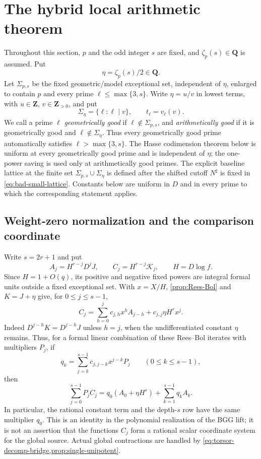 \documentclass[11pt]{article}
\theoremstyle{definition}
\theoremstyle{remark}
\newcommand{\Q}{\mathbf Q}
\newcommand{\Z}{\mathbf Z}
\newcommand{\calK}{\mathcal K}
\begin{document}
\section{The hybrid local arithmetic theorem}\label{sec:hybrid-local}

Throughout this section, $p$ and the odd integer $s$ are fixed, and
$\zeta_p(s)\in\Q$ is assumed.  Put
\[
 \eta=\zeta_p(s)/2\in\Q.
\]
Let $\Sigma_{p,s}$ be the fixed geometric/model exceptional set, independent
of $\eta$, enlarged to contain $p$ and every prime
$\ell\le\max\{3,s\}$.  Write $\eta=u/v$ in lowest terms, with
$u\in\Z$, $v\in\Z_{>0}$, and put
\[
 \Sigma_\eta=\{\ell:\ell\mid v\},
 \qquad t_\ell=v_\ell(v).
\]
We call a prime $\ell$ \emph{geometrically good} if
$\ell\notin\Sigma_{p,s}$, and \emph{arithmetically good} if it is
geometrically good and $\ell\notin\Sigma_\eta$.  Thus every geometrically
good prime automatically satisfies $\ell>\max\{3,s\}$.  The Hasse
codimension theorem below is uniform at every geometrically good prime and is
independent of $\eta$; the one-power saving is used only at arithmetically
good primes.  The explicit baseline lattice at the finite set
$\Sigma_{p,s}\cup\Sigma_\eta$ is defined after the shifted cutoff $N^\sharp$ is fixed in
\eqref{eq:bad-small-lattice}.  Constants below are uniform in $D$ and in every
prime to which the corresponding statement applies.

\subsection{Weight-zero normalization and the comparison coordinate}

Write $s=2r+1$ and put
\begin{equation}\label{eq:A-C-rows}
 A_j=H^{r-j}D^jJ,
 \qquad
 C_j=H^{r-j}\calK_j,
 \qquad
 H=D\log f.
\end{equation}
Since $H=1+O(q)$, its positive and negative fixed powers are integral formal
units outside a fixed exceptional set.  With $x=X/H$, \cref{prop:Rees-Bol}
and $K=J+\eta$ give, for $0\le j\le s-1$,
\begin{equation}\label{eq:C-vs-A}
 \boxed{
 C_j=\sum_{h=0}^jc_{j,h}x^hA_{j-h}
      +c_{j,j}\eta H^r x^j.}
\end{equation}
Indeed $D^{j-h}K=D^{j-h}J$ unless $h=j$, when the undifferentiated
constant $\eta$ remains.  Thus, for a formal linear combination of these
Rees--Bol iterates with multipliers $P_j$, if
\begin{equation}\label{eq:qk-definition}
 q_k=\sum_{j=k}^{s-1}c_{j,j-k}x^{j-k}P_j
 \qquad(0\le k\le s-1),
\end{equation}
then
\begin{equation}\label{eq:corrected-row-decomp}
 \boxed{
 \sum_{j=0}^{s-1}P_jC_j
 =q_0(A_0+\eta H^r)+\sum_{k=1}^{s-1}q_kA_k.}
\end{equation}
In particular, the rational constant term and the depth-$s$ row have the same
multiplier $q_0$.  This is an identity in the polynomial realization of the
BGG lift; it is not an assertion that the functions $C_j$ form a rational
scalar coordinate system for the global source.  Actual global contractions
are handled by \cref{eq:torsor-decomp-bridge,prop:single-unipotent}.
\end{document}
